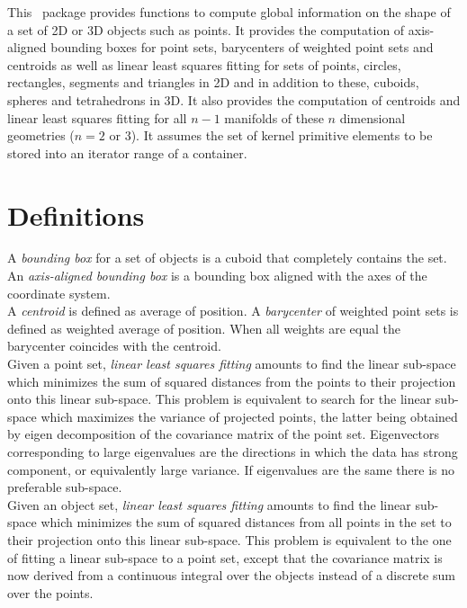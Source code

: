 This \cgal\ package provides functions to compute global information
on the shape of a set of 2D or 3D objects such as points. It provides
the computation of axis-aligned bounding boxes for point sets,
barycenters of weighted point sets and centroids as well as linear
least squares fitting for sets of points, circles, rectangles,
segments and triangles in 2D and in addition to these, cuboids,
spheres and tetrahedrons in 3D. It also provides the computation of
centroids and linear least squares fitting for all $n-1$ manifolds of
these $n$ dimensional geometries ($n = 2$ or $3$). It assumes the set
of kernel primitive elements to be stored into an iterator range of a
container.\\

\section{Definitions}

A \emph{bounding box} for a set of objects is a cuboid that completely
contains the set. An \emph{axis-aligned bounding box} is a bounding
box aligned with the axes of the coordinate system.\\

A \emph{centroid} is defined as average of position. A
\emph{barycenter} of weighted point sets is defined as weighted
average of position. When all weights are equal the barycenter
coincides with the centroid.\\

Given a point set, \emph{linear least squares fitting} amounts to find
the linear sub-space which minimizes the sum of squared distances from
the points to their projection onto this linear sub-space. This
problem is equivalent to search for the linear sub-space which
maximizes the variance of projected points, the latter being obtained
by eigen decomposition of the covariance matrix of the point
set. Eigenvectors corresponding to large eigenvalues are the
directions in which the data has strong component, or equivalently
large variance. If eigenvalues are the same there is no preferable
sub-space.\\

Given an object set, \emph{linear least squares fitting} amounts to find the linear sub-space which minimizes the sum of squared
distances from all points in the set to their projection onto this linear
sub-space. This problem is equivalent to the one of fitting a linear sub-space to a point set, except that the covariance matrix is now derived from a continuous integral over the objects instead of a discrete sum over the points.


